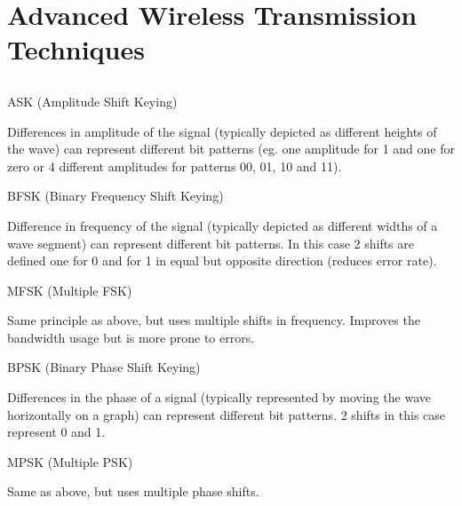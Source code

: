\documentclass[12pt]{article}
\newcommand{\exercise}{\subsection{}\setcounter{subsubsection}{0}}
\begin{document}
\section*{Advanced Wireless Transmission Techniques}
\exercise
\begin{itemize}
    \begin{minipage}{\textwidth}
    \item ASK (Amplitude Shift Keying)

    Differences in amplitude of the signal (typically depicted as different heights of the wave) can represent different bit patterns (eg. one amplitude for 1 and one for zero or 4 different amplitudes for patterns 00, 01, 10 and 11).
    \end{minipage}

    \begin{minipage}{\textwidth}
    \item BFSK (Binary Frequency Shift Keying)

    Difference in frequency of the signal (typically depicted as different widths of a wave segment) can represent different bit patterns. In this case 2 shifts are defined one for 0 and for 1 in equal but opposite direction (reduces error rate).
    \end{minipage}

    \begin{minipage}{\textwidth}
    \item MFSK (Multiple FSK)

    Same principle as above, but uses multiple shifts in frequency. Improves the bandwidth usage but is more prone to errors.
    \end{minipage}

    \begin{minipage}{\textwidth}
    \item BPSK (Binary Phase Shift Keying)

    Differences in the phase of a signal (typically represented by moving the wave horizontally on a graph) can represent different bit patterns. 2 shifts in this case represent 0 and 1.
    \end{minipage}

    \begin{minipage}{\textwidth}
    \item MPSK (Multiple PSK)

    Same as above, but uses multiple phase shifts.
    \end{minipage}
\end{itemize}
\end{document}
